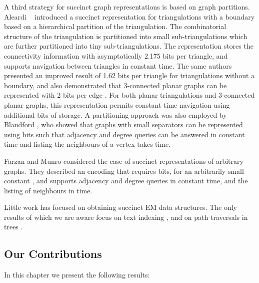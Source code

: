 A third strategy for succinct graph representations is based on graph
partitions.
Aleardi \etal~\cite{DBLP:conf/wads/AleardiDS05}
introduced a succinct representation for triangulations with a
boundary based on a hierarchical partition of the triangulation.
The combinatorial structure of the triangulation is partitioned into small
sub-triangulations which are further partitioned into tiny
sub-triangulations.
The representation stores the connectivity
information with asymptotically 2.175 bits per triangle, and supports
navigation between triangles in constant time.
The same authors presented an improved result of 1.62 bits per triangle for
triangulations without a boundary, and also demonstrated that
3-connected planar graphs can be represented with 2 bits per edge
\cite{DBLP:journals/tcs/AleardiDS08}.
For both planar triangulations and 3-connected planar graphs, this
representation permits constant-time navigation using additional
 bits of storage.
A partitioning approach was also
employed by Blandford \cite{DBLP:conf/soda/BlandfordBK03}, who showed
that graphs with small separators can be represented using 
bits such that adjacency and degree queries can be answered in
constant time and listing the neighbours of a vertex takes
 time.

Farzan and Munro \cite{DBLP:conf/esa/FarzanM08} considered
the case of succinct representations of arbitrary graphs.
They described an encoding that requires
 bits,
for an arbitrarily small constant ,
and supports adjacency and degree queries in constant
time, and the listing of neighbours in  time.

Little work has focused on obtaining succinct EM data structures.
The only results of which we are aware focus on text indexing 
\cite{DBLP:conf/dcc/ChienHSV08,  clark_96}, and on path traversals in 
trees \cite{DillabaughHM08}.

\subsection{Our Contributions}


In this chapter we present the following results:

